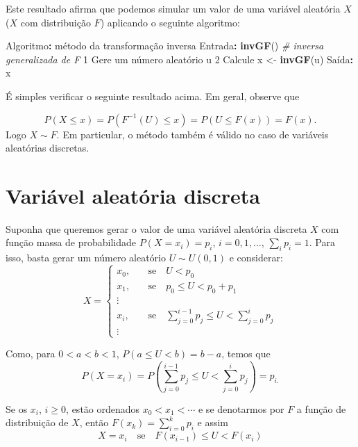 \documentclass[
]{book}
\newenvironment{Shaded}{\begin{snugshade}}{\end{snugshade}}
\newcommand{\CommentTok}[1]{\textcolor[rgb]{0.56,0.35,0.01}{\textit{#1}}}
\newcommand{\DecValTok}[1]{\textcolor[rgb]{0.00,0.00,0.81}{#1}}
\newcommand{\FunctionTok}[1]{\textcolor[rgb]{0.13,0.29,0.53}{\textbf{#1}}}
\newcommand{\NormalTok}[1]{#1}
\newcommand{\OtherTok}[1]{\textcolor[rgb]{0.56,0.35,0.01}{#1}}
\newcommand{\SpecialCharTok}[1]{\textcolor[rgb]{0.81,0.36,0.00}{\textbf{#1}}}
\begin{document}
Este resultado afirma que podemos simular um valor de uma variável aleatória \(X\) (\(X\) com distribuição \(F\)) aplicando o seguinte algoritmo:

\begin{Shaded}
\begin{Highlighting}[]
\NormalTok{Algoritmo}\SpecialCharTok{:}\NormalTok{ método da transformação inversa}
\NormalTok{Entrada}\SpecialCharTok{:} \FunctionTok{invGF}\NormalTok{() }\CommentTok{\# inversa generalizada de F}
  \DecValTok{1}\NormalTok{ Gere um número aleatório u }
  \DecValTok{2}\NormalTok{ Calcule x }\OtherTok{\textless{}{-}} \FunctionTok{invGF}\NormalTok{(u)}
\NormalTok{Saída}\SpecialCharTok{:}\NormalTok{ x}
\end{Highlighting}
\end{Shaded}

É simples verificar o seguinte resultado acima. Em geral, observe que

\[P(X \leq x) = P(F^{-1}(U) \leq x) = P(U \leq F(x)) = F(x).\] Logo \(X \sim F\). Em particular, o método também é válido no caso de variáveis aleatórias discretas.

\section{Variável aleatória discreta}\label{variuxe1vel-aleatuxf3ria-discreta}

Suponha que queremos gerar o valor de uma variável aleatória discreta
\(X\) com função massa de probabilidade \(P(X = x_{i}) = p_{i}\),
\(i=0,1,\ldots\), \(\sum_{i}p_{i}=1\). Para isso, basta gerar um número
aleatório \(U \sim U(0,1)\) e considerar: \[X = \begin{cases}
x_{0},& \quad \text{se} \quad U<p_{0} \\
x_{1},& \quad \text{se} \quad p_{0}\leq U <p_{0}+p_{1}\\
\vdots& \\
x_{i},& \quad \text{se} \quad \sum_{j=0}^{i-1}p_{j}\leq U < \sum_{j=0}^{i}p_{j} \\
\vdots
\end{cases}\]

Como, para \(0<a<b<1\), \(P(a\leq U<b)=b-a\), temos que
\[P(X=x_{i}) = P\left( \sum_{j=0}^{i-1}p_{j} \leq U < \sum_{j=0}^{i}p_{j} \right) = p_{i.}\]

Se os \(x_{i}\), \(i\geq 0\), estão ordenados \(x_{0}<x_{1}<\cdots\) e se
denotarmos por \(F\) a função de distribuição de \(X\), então
\(F(x_{k})=\sum_{i=0}^{k}p_{i}\) e assim
\[X = x_{i} \quad \text{se} \quad F(x_{i-1})\leq U < F(x_{i})\]
\end{document}

